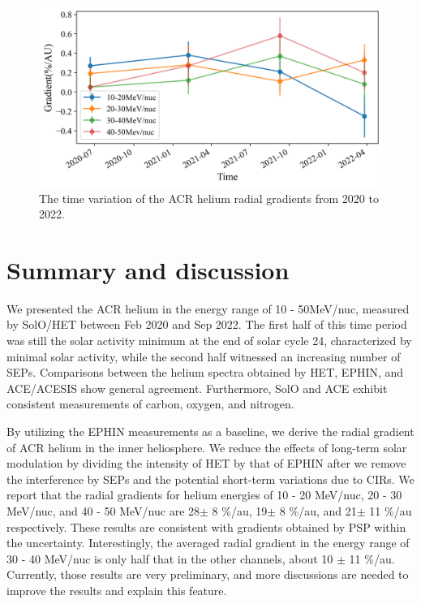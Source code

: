 \begin{figure}[!htb]
    \centering
    \includegraphics[width = \textwidth, height = 0.3\textheight]{images/ACR/timevariation_normalmask_gradient.png}
    \caption[The time variation of the \ac{ACR} helium radial gradients]{The time variation of the \ac{ACR} helium radial gradients from 2020 to 2022. }
    \label{fig:radialgradient_time_variation}
\end{figure}



\section{ Summary and discussion}

We presented the \ac{ACR} helium in the energy range of 10 - 50MeV/nuc, measured by \ac{SolO}/\ac{HET} between Feb 2020 and Sep 2022. The first half of this time period was still the solar activity minimum at the end of solar cycle 24, characterized by minimal solar activity, while the second half witnessed an increasing number of \acp{SEP}.
Comparisons between the helium spectra obtained by \ac{HET}, \ac{EPHIN}, and \ac{ACE}/\ac{ACESIS} show general agreement. Furthermore, \ac{SolO} and \ac{ACE} exhibit consistent measurements of carbon, oxygen, and nitrogen.

By utilizing the \ac{EPHIN} measurements as a baseline, we derive the radial gradient of \ac{ACR} helium in the inner heliosphere. We reduce the effects of long-term solar modulation by dividing the intensity of  \ac{HET} by that of \ac{EPHIN} 
after we remove the interference by \acp{SEP} and the potential short-term variations due to \acp{CIR}.
We report that the radial gradients for helium energies of 10 - 20 MeV/nuc, 20 - 30 MeV/nuc, and 40 - 50 MeV/nuc are 28$\pm$ 8 \%/au, 19$\pm$ 8 \%/au, and 21$\pm$ 11 \%/au respectively. 
These results are consistent with gradients obtained by \ac{PSP} within the uncertainty. Interestingly, the averaged radial gradient in the energy range of 30 - 40 MeV/nuc is only half that in the other channels, about 10 $\pm$ 11 \%/au. Currently, those results are very preliminary, and more discussions are needed to improve the results and explain this feature.

